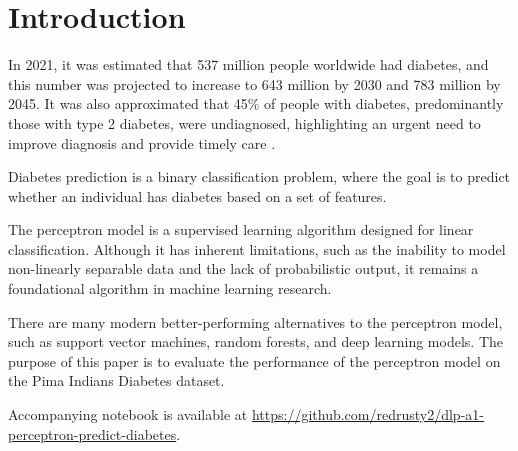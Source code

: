 \section{Introduction}
\label{sec:intro}

In 2021, it was estimated that 537 million people worldwide had diabetes, and this number was projected to increase to 643 million by 2030 and 783 million by 2045. It was also approximated that 45\% of people with diabetes, predominantly those with type 2 diabetes, were undiagnosed, highlighting an urgent need to improve diagnosis and provide timely care \cite{IDF_Atlas_10th_Edition}.

Diabetes prediction is a binary classification problem, where the goal is to predict whether an individual has diabetes based on a set of features. 

The perceptron model is a supervised learning algorithm designed for linear classification. Although it has inherent limitations, such as the inability to model non-linearly separable data and the lack of probabilistic output, it remains a foundational algorithm in machine learning research.

There are many modern better-performing alternatives to the perceptron model, such as support vector machines, random forests, and deep learning models. The purpose of this paper is to evaluate the performance of the perceptron model on the Pima Indians Diabetes dataset.

Accompanying notebook is available at \url{https://github.com/redrusty2/dlp-a1-perceptron-predict-diabetes}.
